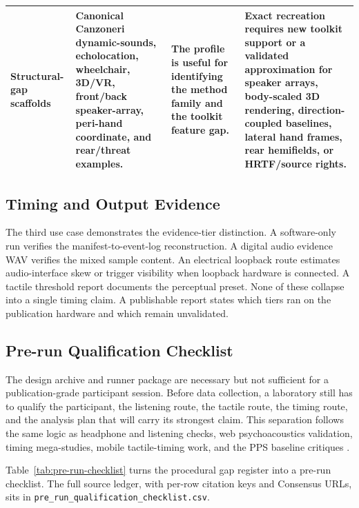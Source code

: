 \documentclass[pdflatex,sn-apa]{sn-jnl}
\newcommand{\code}[1]{\texttt{#1}}
\begin{document}
\begin{table}[t]
\begin{tabularx}{\textwidth}{>{\raggedright\arraybackslash}p{} >{\raggedright\arraybackslash}p{} >{\raggedright\arraybackslash}X >{\raggedright\arraybackslash}p{}}
Structural-gap scaffolds & Canonical Canzoneri dynamic-sounds, echolocation, wheelchair, 3D/VR, front/back speaker-array, peri-hand coordinate, and rear/threat examples. & The profile is useful for identifying the method family and the toolkit feature gap. & Exact recreation requires new toolkit support or a validated approximation for speaker arrays, body-scaled 3D rendering, direction-coupled baselines, lateral hand frames, rear hemifields, or HRTF/source rights. \\
\bottomrule
\end{tabularx}
\end{table}

\subsection{Timing and Output Evidence}

The third use case demonstrates the evidence-tier distinction. A software-only run verifies the manifest-to-event-log reconstruction. A digital audio evidence WAV verifies the mixed sample content. An electrical loopback route estimates audio-interface skew or trigger visibility when loopback hardware is connected. A tactile threshold report documents the perceptual preset. None of these collapse into a single timing claim. A publishable report states which tiers ran on the publication hardware and which remain unvalidated.

\subsection{Pre-run Qualification Checklist}

The design archive and runner package are necessary but not sufficient for a publication-grade participant session. Before data collection, a laboratory still has to qualify the participant, the listening route, the tactile route, the timing route, and the analysis plan that will carry its strongest claim. This separation follows the same logic as headphone and listening checks, web psychoacoustics validation, timing mega-studies, mobile tactile-timing work, and the PPS baseline critiques \citep{Milne2021,Mok2023,Bridges2020,Hirst2026,Roussel2025,Holmes2020,Hobeika2019}.

Table~\ref{tab:pre-run-checklist} turns the procedural gap register into a pre-run checklist. The full source ledger, with per-row citation keys and Consensus URLs, sits in \code{pre\_run\_qualification\_checklist.csv}.
\end{document}
